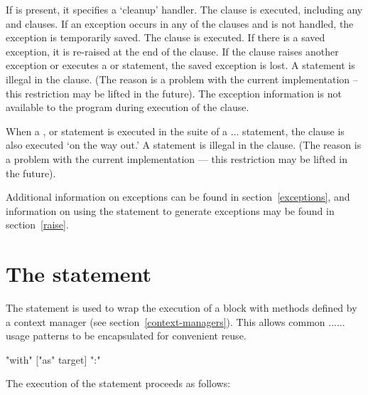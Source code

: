 If  is present, it specifies a `cleanup' handler.  The
 clause is executed, including any  and
 clauses.  If an exception occurs in any of the clauses
and is not handled, the exception is temporarily saved. The
 clause is executed.  If there is a saved exception,
it is re-raised at the end of the  clause.
If the  clause raises another exception or
executes a  or  statement, the saved
exception is lost.  A  statement is illegal in the
 clause.  (The reason is a problem with the current
implementation -- this restriction may be lifted in the future).  The
exception information is not available to the program during execution of
the  clause.

When a ,  or  statement is
executed in the  suite of a ...
statement, the  clause is also executed `on the way out.' A
 statement is illegal in the  clause.
(The reason is a problem with the current implementation --- this
restriction may be lifted in the future).

Additional information on exceptions can be found in
section~\ref{exceptions}, and information on using the 
statement to generate exceptions may be found in section~\ref{raise}.


\section{The  statement\label{with}}


The  statement is used to wrap the execution of a block
with methods defined by a context manager (see
section~\ref{context-managers}). This allows common
...... usage patterns to
be encapsulated for convenient reuse.

\begin{productionlist}
  {"with"  ["as" target] ":" }
\end{productionlist}

The execution of the  statement proceeds as follows:

